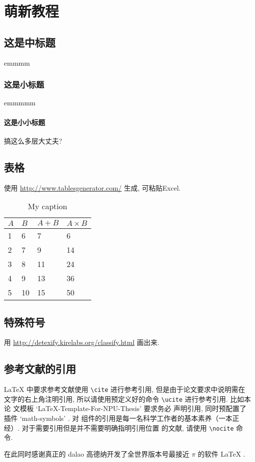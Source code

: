 \chapter{萌新教程}
\section{这是中标题}
emmmm
\subsection{这是小标题}
emmmmm
\subsubsection{这是小小标题}
搞这么多层大丈夫?

\section{表格}

使用 \href{http://www.tablesgenerator.com/}{http://www.tablesgenerator.com/} 生成, 可粘贴Excel.

\begin{table}[!h]
    \centering
    \caption{My caption}
    \label{my-label}
    \begin{tabular}{@{}llll@{}}
        \toprule
        $A$ & $B$ & $A+B$ & $A\times B$ \\ \midrule
        1   & 6   & 7     & 6           \\
        2   & 7   & 9     & 14          \\
        3   & 8   & 11    & 24          \\
        4   & 9   & 13    & 36          \\
        5   & 10  & 15    & 50          \\ \bottomrule
    \end{tabular}
\end{table}

\section{特殊符号}

用 \href{http://detexify.kirelabs.org/classify.html}{http://detexify.kirelabs.org/classify.html}
画出来.

\section{参考文献的引用}

\LaTeX{} 中要求参考文献使用 \lstinline`\cite` 进行参考引用, 但是由于论文要求中说明需在
文字的右上角注明引用, 所以请使用预定义好的命令 \lstinline`\ucite` 进行参考引用. 比如本论
文模板 `LaTeX-Template-For-NPU-Thesis'  要求务必
声明引用, 同时预配置了插件 `math-symbols' . 对
组件的引用是每一名科学工作者的基本素养（一本正经）. 对于需要引用但是并不需要明确指明引用位置
的文献, 请使用 \lstinline`\nocite` 命令.

在此同时感谢真正的 dalao 高德纳开发了全世界版本号最接近 $\pi$ 的软件 \LaTeX{}
\nocite{lamport1989latex:}.


\endinput
